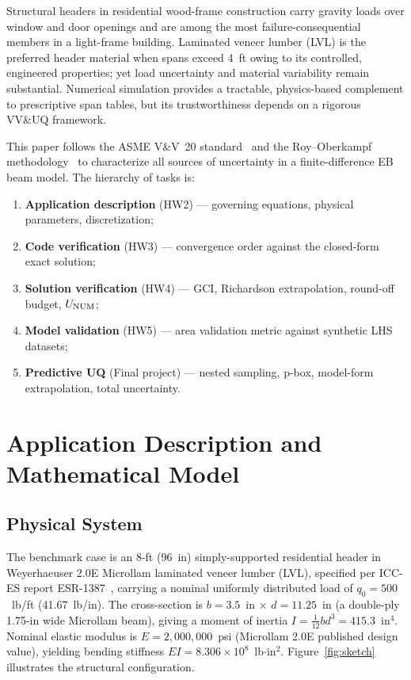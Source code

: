 \documentclass[10pt,twocolumn]{article}
\begin{document}
Structural headers in residential wood-frame construction carry gravity
loads over window and door openings and are among the most
failure-consequential members in a light-frame building.
Laminated veneer lumber (LVL) is the preferred header material when
spans exceed 4~ft owing to its controlled, engineered properties;
yet load uncertainty and material variability remain substantial.
Numerical simulation provides a tractable, physics-based complement
to prescriptive span tables, but its trustworthiness depends on a
rigorous VV\&UQ framework.

This paper follows the ASME V\&V~20 standard~\cite{asme2009} and
the Roy--Oberkampf methodology~\cite{roy2011} to characterize all
sources of uncertainty in a finite-difference EB beam model.
The hierarchy of tasks is:
\begin{enumerate}[leftmargin=*, itemsep=0pt]
  \item \textbf{Application description} (HW2) --- governing equations,
    physical parameters, discretization;
  \item \textbf{Code verification} (HW3) --- convergence order against
    the closed-form exact solution;
  \item \textbf{Solution verification} (HW4) --- GCI, Richardson
    extrapolation, round-off budget, $U_{\rm NUM}$;
  \item \textbf{Model validation} (HW5) --- area validation metric
    against synthetic LHS datasets;
  \item \textbf{Predictive UQ} (Final project) --- nested sampling,
    p-box, model-form extrapolation, total uncertainty.
\end{enumerate}

\section{Application Description and Mathematical Model}
\label{sec:application}

\subsection{Physical System}
\label{sec:phys}

The benchmark case is an 8-ft (96~in) simply-supported residential
header in Weyerhaeuser 2.0E Microllam laminated veneer lumber (LVL),
specified per ICC-ES report ESR-1387~\cite{esr1387}, carrying a
nominal uniformly distributed load of $q_0=500$~lb/ft
(41.67~lb/in).
The cross-section is $b=3.5$~in $\times$ $d=11.25$~in (a double-ply
1.75-in wide Microllam beam), giving a moment of
inertia $I=\tfrac{1}{12}bd^3=415.3$~in$^4$.
Nominal elastic modulus is $E=2{,}000{,}000$~psi (Microllam 2.0E
published design value), yielding bending stiffness
$EI=8.306\times10^8$~lb$\cdot$in$^2$.
Figure~\ref{fig:sketch} illustrates the structural configuration.
\end{document}
